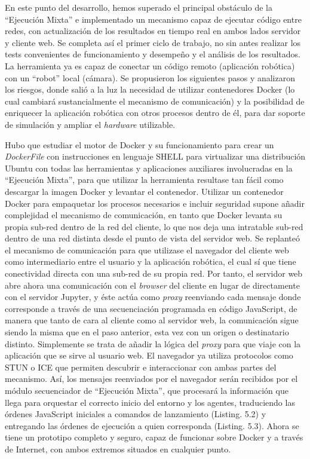 En este punto del desarrollo, hemos superado el principal obstáculo de la ``Ejecución Mixta'' e implementado un mecanismo capaz de ejecutar código entre redes, con actualización de los resultados en tiempo real en ambos lados servidor  y cliente web. Se completa así el primer ciclo de trabajo, no sin antes realizar los tests convenientes de funcionamiento y desempeño y el análisis de los resultados. La herramienta ya es capaz de conectar un código remoto (aplicación robótica) con un ``robot'' local (cámara). Se propusieron los siguientes pasos y analizaron los riesgos, donde salió a la luz la necesidad de utilizar contenedores Docker (lo cual cambiará sustancialmente el mecanismo de comunicación) y la posibilidad de enriquecer la aplicación robótica con otros procesos dentro de él, para dar soporte de simulación y ampliar el \textit{hardware} utilizable.

Hubo que estudiar el motor de Docker y su funcionamiento para crear un \textit{DockerFile} con instrucciones en lenguaje SHELL para virtualizar una distribución Ubuntu con todas las herramientas y aplicaciones auxiliares involucradas en la ``Ejecución Mixta'', para que utilizar la herramienta resultase tan fácil como descargar la imagen Docker y levantar el contenedor. Utilizar un contenedor Docker para empaquetar los procesos necesarios e incluir seguridad supone añadir complejidad el mecanismo de comunicación, en tanto que Docker levanta su propia sub-red dentro de la red del cliente, lo que nos deja una intratable sub-red dentro de una red distinta desde el punto de vista del servidor web. Se replanteó el mecanismo de comunicación para que utilizase el navegador del cliente web como intermediario entre el usuario y la aplicación robótica, el cual sí que tiene conectividad directa con una sub-red de su propia red. Por tanto, el servidor web abre ahora una comunicación con el \textit{browser} del cliente en lugar de directamente con el servidor Jupyter, y éste actúa como \textit{proxy} reenviando cada mensaje donde corresponde a través de una secuenciación programada en código JavaScript, de manera que tanto de cara al cliente como al servidor web, la comunicación sigue siendo la misma que en el paso anterior, esta vez con un origen o destinatario distinto. Simplemente se trata de añadir la lógica del \textit{proxy} para que viaje con la aplicación que se sirve al usuario web. El navegador ya utiliza protocolos como STUN o ICE que permiten descubrir e interaccionar con ambas partes del mecanismo. Así, los mensajes reenviados por el navegador serán recibidos por el módulo secuenciador de ``Ejecución Mixta'', que procesará la información que llega para orquestar el correcto inicio del entorno y los agentes, traduciendo las órdenes JavaScript iniciales a comandos de lanzamiento (Listing. 5.2) y entregando las órdenes de ejecución a quien corresponda (Listing. 5.3). Ahora se tiene un prototipo completo y seguro, capaz de funcionar sobre Docker y a través de Internet, con ambos extremos situados en cualquier punto.

